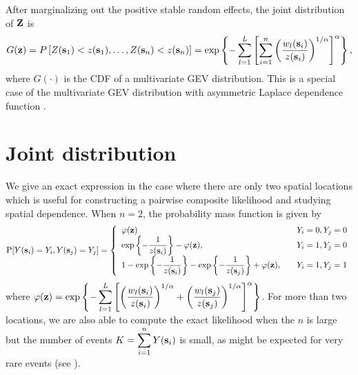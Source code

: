 \documentclass[11pt]{article}
\begin{document}
After marginalizing out the positive stable random effects, the joint distribution of $\mbox{\bf Z}$ is
\begin{align}\label{rbeq:jointCDF}
  G(\mbox{\bf z}) = P\left[Z(\mbox{\bf s}_1) < z(\mbox{\bf s}_1), \ldots, Z(\mbox{\bf s}_n) < z(\mbox{\bf s}_n)\right] = \exp\left\{-\sum_{l=1}^L\left[\sum_{i=1}^n\left(\frac{w_{l}(\mbox{\bf s}_i)}{z(\mbox{\bf s}_i)}\right)^{1/\alpha}\right]^{\alpha}\right\},
\end{align}
where $G(\cdot)$ is the CDF of a multivariate GEV distribution.
This is a special case of the multivariate GEV distribution with asymmetric Laplace dependence function \citep{Tawn1990}.



\section{Joint distribution}\label{rbs:multivariate}
We give an exact expression in the case where there are only two spatial locations which is useful for constructing a pairwise composite likelihood \citep{Padoan2010} and studying spatial dependence.
When $n = 2$, the probability mass function is given by
\begin{align} \label{rbeq:biv}
  \text{P}[Y(\mbox{\bf s}_i) = Y_i, Y(\mbox{\bf s}_j) = Y_j] = \left\{ \begin{array}{ll}
    \varphi(\mbox{\bf z}) &Y_i = 0, Y_j = 0\\
    \exp\left\{ - \displaystyle \frac{ 1 }{ z(\mbox{\bf s}_i) } \right\} - \varphi(\mbox{\bf z}), &Y_i = 1, Y_j = 0 \\
    1 - \exp\left\{ - \displaystyle\frac{ 1 }{ z(\mbox{\bf s}_i) } \right\} - \exp \left\{ -\displaystyle \frac{ 1 }{z(\mbox{\bf s}_j)} \right\} + \varphi(\mbox{\bf z}), \quad &Y_i = 1, Y_j = 1
  \end{array} \right.
\end{align}
where $\varphi(\mbox{\bf z}) = \exp \left\{ - \displaystyle \sum_{ l = 1 }^{ L } \left[ \left( \displaystyle \frac{ w_{ l }(\mbox{\bf s}_i) }{ z(\mbox{\bf s}_i) } \right)^{1/\alpha} + \left( \displaystyle \frac{ w_{l }(\mbox{\bf s}_j)}{z(\mbox{\bf s}_j)} \right)^{1/\alpha} \right]^{\alpha} \right\}$.
For more than two locations, we are also able to compute the exact likelihood when the $n$ is large but the number of events $K = \displaystyle \sum_{i = 1}^n Y(\mbox{\bf s}_i)$ is small, as might be expected for very rare events (see ).
\end{document}
